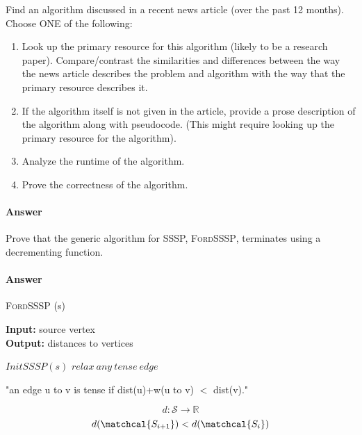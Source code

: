 \documentclass{article}
\begin{document}

Find an algorithm discussed in a recent news article (over the past 12 months).
Choose ONE of the following:
\begin{enumerate}
    \item Look up the primary resource for this algorithm (likely to be a
        research paper).  Compare/contrast the similarities and differences between the
        way the news article describes the problem and algorithm with the way
        that the primary resource describes it.
    \item If the algorithm itself is not given in the article, provide a prose
        description of the algorithm along with pseudocode. (This might require
        looking up the primary resource for the algorithm).
    \item Analyze the runtime of the algorithm.
    \item Prove the correctness of the algorithm.
\end{enumerate}

\paragraph{Answer}


Prove that the generic algorithm for SSSP, \textsc{FordSSSP}, terminates using a
decrementing function.

\paragraph{Answer}

\begin{algorithm} \caption{\textsc{FordSSSP} (s)}\label{alg:seb}
    {\bf Input:} source vertex\\
    {\bf Output:} distances to vertices
    \begin{algorithmic}[1]
        \State$InitSSSP(s)$
            \State$relax\ any\ tense\ edge$
        \EndWhile\\
    \end{algorithmic}
\end{algorithm}

"an edge u to v is tense if dist(u)+w(u to v) $<$ dist(v)."

$$d : \mathcal{S} \rightarrow \mathbb{R}$$
$$d(\matchcal{S_{i+1}}) < d(\matchcal{S_i})$$
\end{document}
